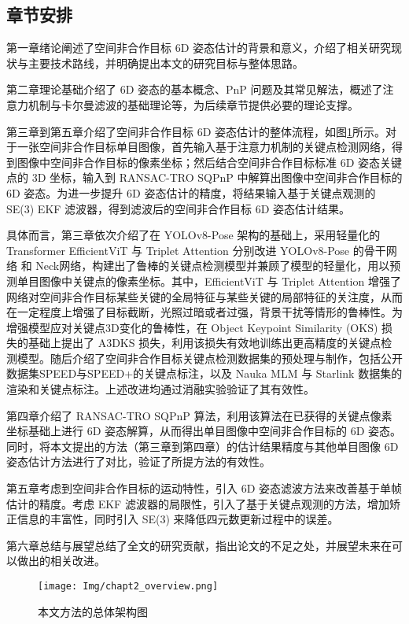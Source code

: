 \subsection{章节安排}
第一章绪论阐述了空间非合作目标 6D 姿态估计的背景和意义，介绍了相关研究现状与主要技术路线，并明确提出本文的研究目标与整体思路。

第二章理论基础介绍了 6D 姿态的基本概念、PnP 问题及其常见解法，概述了注意力机制与卡尔曼滤波的基础理论等，为后续章节提供必要的理论支撑。

第三章到第五章介绍了空间非合作目标 6D 姿态估计的整体流程，如图\ref{fig:6D_pose_estimation_archieture}所示。对于一张空间非合作目标单目图像，首先输入基于注意力机制的关键点检测网络，得到图像中空间非合作目标的像素坐标；然后结合空间非合作目标标准 6D 姿态关键点的 3D 坐标，输入到 RANSAC-TRO SQPnP 中解算出图像中空间非合作目标的 6D 姿态。为进一步提升 6D 姿态估计的精度，将结果输入基于关键点观测的 SE(3) EKF 滤波器，得到滤波后的空间非合作目标 6D 姿态估计结果。

具体而言，第三章依次介绍了在 YOLOv8-Pose 架构的基础上，采用轻量化的 Transformer EfficientViT 与 Triplet Attention 分别改进 YOLOv8-Pose 的骨干网络 和 Neck网络，构建出了鲁棒的关键点检测模型并兼顾了模型的轻量化，用以预测单目图像中关键点的像素坐标。其中，EfficientViT 与 Triplet Attention 增强了网络对空间非合作目标某些关键的全局特征与某些关键的局部特征的关注度，从而在一定程度上增强了目标截断，光照过暗或者过强，背景干扰等情形的鲁棒性。为增强模型应对关键点3D变化的鲁棒性，在 Object Keypoint Similarity (OKS) 损失的基础上提出了 A3DKS 损失，利用该损失有效地训练出更高精度的关键点检测模型。随后介绍了空间非合作目标关键点检测数据集的预处理与制作，包括公开数据集SPEED与SPEED+的关键点标注，以及 Nauka MLM 与 Starlink 数据集的渲染和关键点标注。上述改进均通过消融实验验证了其有效性。

第四章介绍了 RANSAC-TRO SQPnP 算法，利用该算法在已获得的关键点像素坐标基础上进行 6D 姿态解算，从而得出单目图像中空间非合作目标的 6D 姿态。同时，将本文提出的方法（第三章到第四章）的估计结果精度与其他单目图像 6D 姿态估计方法进行了对比，验证了所提方法的有效性。

第五章考虑到空间非合作目标的运动特性，引入 6D 姿态滤波方法来改善基于单帧估计的精度。考虑 EKF 滤波器的局限性，引入了基于关键点观测的方法，增加矫正信息的丰富性，同时引入 SE(3) 来降低四元数更新过程中的误差。

第六章总结与展望总结了全文的研究贡献，指出论文的不足之处，并展望未来在可以做出的相关改进。

\begin{figure}[htbp]
	\centering
	\texttt{[image: Img/chapt2\_overview.png]}
	\caption{本文方法的总体架构图}
	\label{fig:6D_pose_estimation_archieture}
\end{figure}

